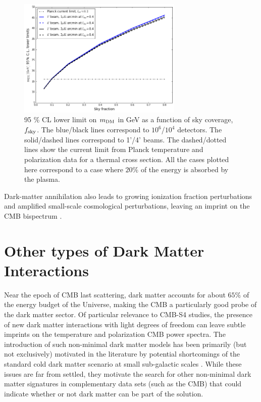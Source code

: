 \begin{figure}[t]
\begin{center}
\includegraphics[width=0.7\textwidth]{DarkMatter/Mdm_limit_f0p2_ul_0728.png}
\caption{95 \% CL lower limit on $m_{\rm DM}$ in GeV as a function of sky coverage, $f_{\rm sky}$.
The blue/black lines correspond to $10^6$/$10^4$ detectors. The solid/dashed lines correspond to 1'/4' beams.
The dashed/dotted lines show the current limit from Planck temperature and polarization data for a thermal cross section. All the cases plotted here correspond to a case where $20\%$ of the energy is absorbed by the plasma.}\label{fig:DM_annihilation}
\end{center}
\end{figure}

Dark-matter annihilation also leads to growing ionization fraction perturbations and amplified small-scale cosmological perturbations, leaving an imprint on the CMB bispectrum \cite{Dvorkin:2013cga}.

%
\section{Other types of Dark Matter Interactions}
%
Near the epoch of CMB last scattering, dark matter accounts for about $65\%$ of the energy budget of the Universe, making the CMB a particularly good probe of the dark matter sector. Of particular relevance to CMB-S4 studies, the presence of new dark matter interactions with light degrees of freedom \cite{Goldberg:1986nk,Carlson:1992fn} can leave subtle imprints on the temperature and polarization CMB power spectra. The introduction of such non-minimal dark matter models has been primarily (but not exclusively) motivated in the literature by potential shortcomings of the standard cold dark matter scenario at small sub-galactic scales \cite{deBlok:1997zlw,Klypin:1999uc,Moore:1999nt}. While these issues are far from settled, they motivate the search for other non-minimal dark matter signatures in complementary data sets (such as the CMB) that could indicate whether or not dark matter can be part of the solution. 

